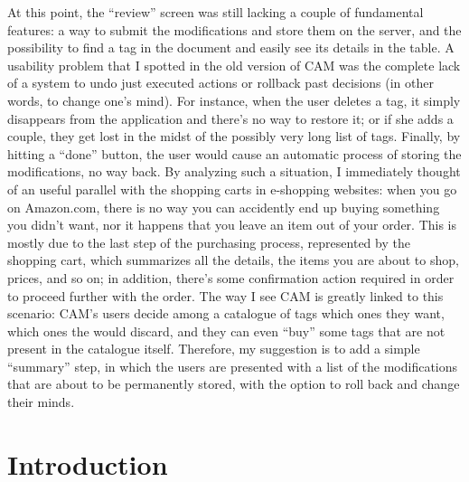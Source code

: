 \documentclass[12pt,svgnames]{memoir}
\begin{document}
At this point, the ``review'' screen was still lacking a couple of
fundamental features: a way to submit the modifications and store them
on the server, and the possibility to find a tag in the document and
easily see its details in the table. A usability problem that I spotted
in the old version of CAM was the complete lack of a system to undo just
executed actions or rollback past decisions (in other words, to change
one's mind). For instance, when the user deletes a tag, it simply
disappears from the application and there's no way to restore it; or if
she adds a couple, they get lost in the midst of the possibly very long
list of tags. Finally, by hitting a ``done'' button, the user would
cause an automatic process of storing the modifications, no way back. By
analyzing such a situation, I immediately thought of an useful parallel
with the shopping carts in e-shopping websites: when you go on
Amazon.com, there is no way you can accidently end up buying something
you didn't want, nor it happens that you leave an item out of your
order. This is mostly due to the last step of the purchasing process,
represented by the shopping cart, which summarizes all the details, the
items you are about to shop, prices, and so on; in addition, there's
some confirmation action required in order to proceed further with the
order. The way I see CAM is greatly linked to this scenario: CAM's users
decide among a catalogue of tags which ones they want, which ones the
would discard, and they can even ``buy'' some tags that are not present
in the catalogue itself. Therefore, my suggestion is to add a simple
``summary'' step, in which the users are presented with a list of the
modifications that are about to be permanently stored, with the option
to roll back and change their minds.

\chapter*{Introduction}\label{introduction}
\end{document}
